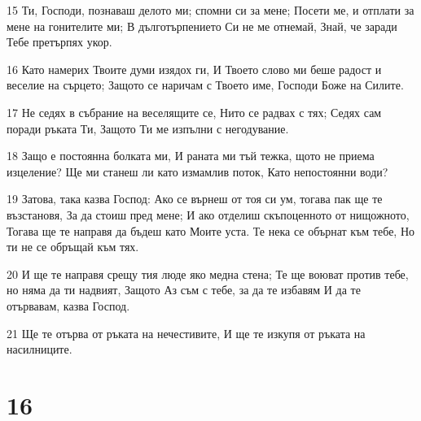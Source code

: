 \par 15 Ти, Господи, познаваш делото ми; спомни си за мене; Посети ме, и отплати за мене на гонителите ми; В дълготърпението Си не ме отнемай, Знай, че заради Тебе претърпях укор.
\par 16 Като намерих Твоите думи изядох ги, И Твоето слово ми беше радост и веселие на сърцето; Защото се наричам с Твоето име, Господи Боже на Силите.
\par 17 Не седях в събрание на веселящите се, Нито се радвах с тях; Седях сам поради ръката Ти, Защото Ти ме изпълни с негодувание.
\par 18 Защо е постоянна болката ми, И раната ми тъй тежка, щото не приема изцеление? Ще ми станеш ли като измамлив поток, Като непостоянни води?
\par 19 Затова, така казва Господ: Ако се върнеш от тоя си ум, тогава пак ще те възстановя, За да стоиш пред мене; И ако отделиш скъпоценното от нищожното, Тогава ще те направя да бъдеш като Моите уста. Те нека се обърнат към тебе, Но ти не се обръщай към тях.
\par 20 И ще те направя срещу тия люде яко медна стена; Те ще воюват против тебе, но няма да ти надвият, Защото Аз съм с тебе, за да те избавям И да те отървавам, казва Господ.
\par 21 Ще те отърва от ръката на нечестивите, И ще те изкупя от ръката на насилниците.

\chapter{16}

